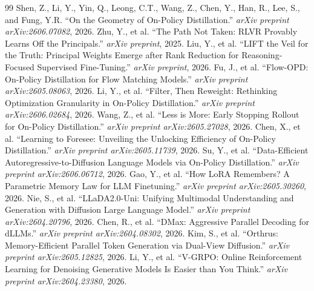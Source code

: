 \documentclass[11pt,a4paper]{article}
\begin{document}
\begin{thebibliography}{99}
 Shen, Z., Li, Y., Yin, Q., Leong, C.T., Wang, Z., Chen, Y., Han, R., Lee, S., and Fung, Y.R. ``On the Geometry of On-Policy Distillation.'' \emph{arXiv preprint arXiv:2606.07082}, 2026.
 Zhu, Y., et al. ``The Path Not Taken: RLVR Provably Learns Off the Principals.'' \emph{arXiv preprint}, 2025.
 Liu, Y., et al. ``LIFT the Veil for the Truth: Principal Weights Emerge after Rank Reduction for Reasoning-Focused Supervised Fine-Tuning.'' \emph{arXiv preprint}, 2026.
 Fu, J., et al. ``Flow-OPD: On-Policy Distillation for Flow Matching Models.'' \emph{arXiv preprint arXiv:2605.08063}, 2026.
 Li, Y., et al. ``Filter, Then Reweight: Rethinking Optimization Granularity in On-Policy Distillation.'' \emph{arXiv preprint arXiv:2606.02684}, 2026.
 Wang, Z., et al. ``Less is More: Early Stopping Rollout for On-Policy Distillation.'' \emph{arXiv preprint arXiv:2605.27028}, 2026.
 Chen, X., et al. ``Learning to Foresee: Unveiling the Unlocking Efficiency of On-Policy Distillation.'' \emph{arXiv preprint arXiv:2605.11739}, 2026.
 Su, Y., et al. ``Data-Efficient Autoregressive-to-Diffusion Language Models via On-Policy Distillation.'' \emph{arXiv preprint arXiv:2606.06712}, 2026.
 Gao, Y., et al. ``How LoRA Remembers? A Parametric Memory Law for LLM Finetuning.'' \emph{arXiv preprint arXiv:2605.30260}, 2026.
 Nie, S., et al. ``LLaDA2.0-Uni: Unifying Multimodal Understanding and Generation with Diffusion Large Language Model.'' \emph{arXiv preprint arXiv:2604.20796}, 2026.
 Chen, R., et al. ``DMax: Aggressive Parallel Decoding for dLLMs.'' \emph{arXiv preprint arXiv:2604.08302}, 2026.
 Kim, S., et al. ``Orthrus: Memory-Efficient Parallel Token Generation via Dual-View Diffusion.'' \emph{arXiv preprint arXiv:2605.12825}, 2026.
 Li, Y., et al. ``V-GRPO: Online Reinforcement Learning for Denoising Generative Models Is Easier than You Think.'' \emph{arXiv preprint arXiv:2604.23380}, 2026.
\end{thebibliography}
\end{document}
